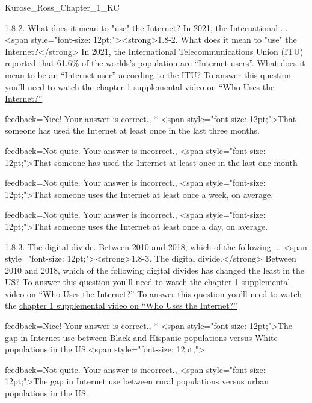 \documentclass[a4paper,twocolumn]{article}
\begin{document}
\begin{quiz}{Kurose_Ross_Chapter_1_KC}
\begin{multi}[
	points=1,
	penalty=0.33333,
]{1.8-2. What does it mean to "use" the Internet? In 2021, the International ...}
<span style="font-size: 12pt;"><strong>1.8-2. What does it mean to "use" the Internet?</strong> In 2021, the International Telecommunications Union (ITU) reported that 61.6\% of the worlds’s population are “Internet users”.  What does it mean to be an “Internet user” according to the ITU? To answer this question you’ll need to watch the \href{https://www.youtube.com/watch?v=-YaGGf8C1A4}{chapter 1 supplemental video on “Who Uses  the Internet?”}
\item[feedback={Nice!  Your answer is correct.},]* <span style="font-size: 12pt;">That someone has used the Internet at least once in the last three months.
\item[feedback={Not quite.  Your answer is incorrect.},] <span style="font-size: 12pt;">That someone has used the Internet at least once in the last one month
\item[feedback={Not quite.  Your answer is incorrect.},] <span style="font-size: 12pt;">That someone uses the Internet at least once a week, on average.
\item[feedback={Not quite.  Your answer is incorrect.},] <span style="font-size: 12pt;">That someone uses the Internet at least once a day, on average.
\end{multi}

\begin{multi}[
	points=1,
	penalty=0.33333,
]{1.8-3.  The digital divide. Between 2010 and 2018, which of the following ...}
<span style="font-size: 12pt;"><strong>1.8-3.  The digital divide.</strong> Between 2010 and 2018, which of the following digital divides has changed the least in the US? To answer this question you’ll need to watch the chapter 1 supplemental video on “Who Uses  the Internet?” To answer this question you’ll need to watch the \href{https://www.youtube.com/watch?v=-YaGGf8C1A4}{chapter 1 supplemental video on “Who Uses  the Internet?”}
\item[feedback={Nice!  Your answer is correct.},]* <span style="font-size: 12pt;">The gap in Internet use between Black and Hispanic populations versus White populations in the US.<span style="font-size: 12pt;">
\item[feedback={Not quite.  Your answer is incorrect.},] <span style="font-size: 12pt;">The gap in Internet use between rural populations versus urban populations in the US.
\end{multi}


\end{quiz}
\end{document}
